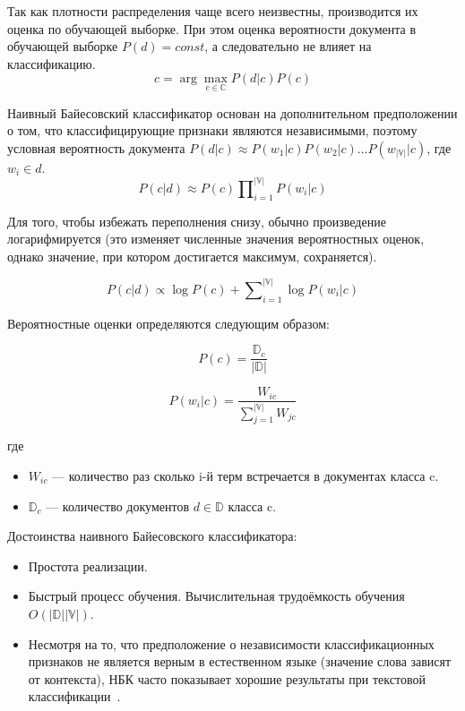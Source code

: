 Так как плотности распределения чаще всего неизвестны, производится их оценка
по обучающей выборке. При этом оценка вероятности документа в обучающей 
выборке $P(d) = const$, а следовательно не влияет на классификацию.
\begin{equation}
c = \arg\!\underset{c \in \mathbb{C}}{\max} P(d | c) P(c)
\end{equation}

Наивный Байесовский классификатор основан на дополнительном предположении
о том, что классифицирующие признаки являются независимыми, поэтому
условная вероятность документа $P(d | c) \approx P(w_1 | c) P(w_2 | c) \ldots P(w_{|\mathbb{V}|} | c) $, где $w_i \in d$.
\begin{equation}
P(c | d) \approx P(c) \prod\nolimits_{i=1}^{|\mathbb{V}|} P(w_i | c) 
\end{equation}

Для того, чтобы избежать переполнения снизу, обычно произведение
логарифмируется (это изменяет численные значения вероятностных оценок, 
однако значение, при котором достигается максимум, сохраняется).

\begin{equation}
P(c | d) \propto \log P(c) + \sum\nolimits_{i=1}^{|\mathbb{V}|} \log P(w_i | c) 
\end{equation}

Вероятностные оценки определяются следующим образом:

\begin{equation}
P(c) = \frac{\mathbb{D}_c}{|\mathbb{D}|}
\end{equation}

\begin{equation}
P(w_i | c) = \frac{W_{ic}}{\sum\nolimits_{j=1}^{|\mathbb{V}|} W_{jc}}
\end{equation}

где 
\begin{itemize}

\item
$W_{ic}$ --- количество раз сколько i-й терм встречается в документах класса c.

\item
$\mathbb{D}_c$ --- количество документов $d \in \mathbb{D}$ класса c.

\end{itemize}

Достоинства наивного Байесовского классификатора:
\begin{itemize}

\item
Простота реализации.

\item
Быстрый процесс обучения. Вычислительная трудоёмкость обучения $O(|\mathbb{D}| |\mathbb{V}|)$.

\item
Несмотря на то, что предположение о независимости классификационных 
признаков не является верным в естественном языке (значение слова зависят от контекста), 
НБК часто показывает хорошие результаты при текстовой классификации~\cite{Pang2002}. 

\end{itemize}

